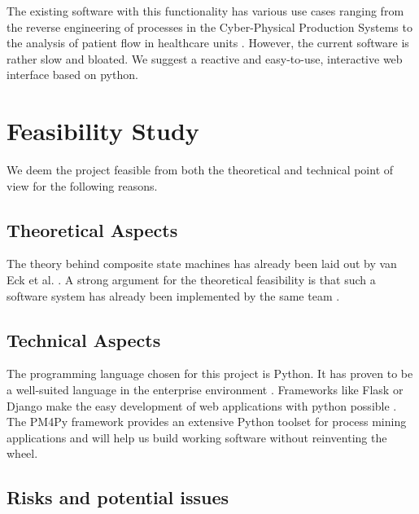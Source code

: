 \documentclass[12pt]{extarticle}
\begin{document}
The existing software \cite{prom} with this functionality has various use cases ranging from the reverse engineering of processes in the Cyber-Physical Production Systems\cite{cpps} to the analysis of patient flow in healthcare units \cite{patient}. However, the current software is rather slow and bloated. We suggest a reactive and easy-to-use, interactive web interface based on python.

\section{Feasibility Study}

We deem the project feasible from both the theoretical and technical point of view for the following reasons.

\subsection{Theoretical Aspects}

The theory behind composite state machines has already been laid out by van Eck et al. \cite{csm-intro}. A strong argument for the theoretical feasibility is that such a software system has already been implemented by the same team \cite{prom}.

\subsection{Technical Aspects}

The programming language chosen for this project is Python. It has proven to be a well-suited language in the enterprise environment \cite{danjou}. Frameworks like Flask or Django make the easy development of web applications with python possible \cite{framework}. The PM4Py framework provides an extensive Python toolset for process mining applications and will help us build working software without reinventing the wheel.

\subsection{Risks and potential issues}
\end{document}
